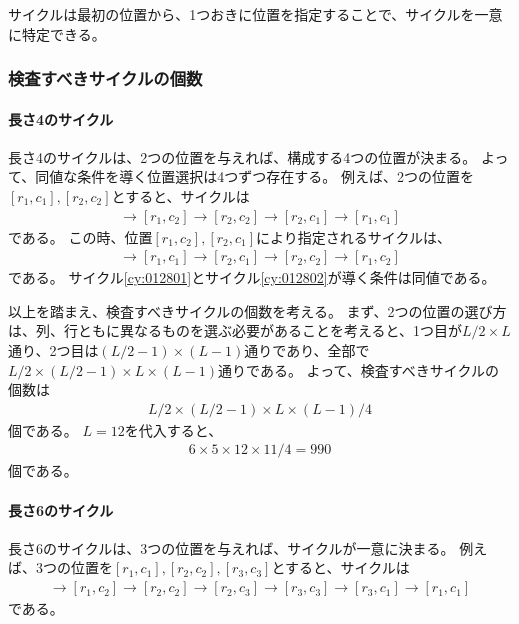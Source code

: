 \documentclass[a4paper,11pt,dvipdfmx]{jsarticle}
\theoremstyle{definition}
\begin{document}
サイクルは最初の位置から、1つおきに位置を指定することで、サイクルを一意に特定できる。

\subsubsection{検査すべきサイクルの個数}
\paragraph{長さ4のサイクル}
長さ4のサイクルは、2つの位置を与えれば、構成する4つの位置が決まる。
よって、同値な条件を導く位置選択は4つずつ存在する。
例えば、2つの位置を$[r_1, c_1],[r_2, c_2]$とすると、サイクルは
\begin{align}
  [r_1, c_1]\rightarrow[r_1,c_2]\rightarrow[r_2,c_2]\rightarrow[r_2,c_1]\rightarrow[r_1,c_1]\label{cy:012801}
\end{align}
である。
この時、位置$[r_1, c_2],[r_2, c_1]$により指定されるサイクルは、
\begin{align}
  [r_1,c_2]\rightarrow[r_1,c_1]\rightarrow[r_2,c_1]\rightarrow[r_2,c_2]\rightarrow[r_1,c_2]\label{cy:012802}
\end{align}
である。
サイクル\ref{cy:012801}とサイクル\ref{cy:012802}が導く条件は同値である。

以上を踏まえ、検査すべきサイクルの個数を考える。
まず、2つの位置の選び方は、列、行ともに異なるものを選ぶ必要があることを考えると、1つ目が$L/2\times L$通り、2つ目は$(L/2-1)\times (L-1)$通りであり、全部で$L/2\times (L/2-1)\times L\times (L-1)$通りである。
よって、検査すべきサイクルの個数は
\begin{align}
  L/2\times (L/2-1)\times L\times (L-1)/4\label{eq:012803}
\end{align}
個である。
$L=12$を代入すると、
\begin{align}
  6\times 5\times 12\times 11 /4 = 990
\end{align}
個である。

\paragraph{長さ6のサイクル}
長さ6のサイクルは、3つの位置を与えれば、サイクルが一意に決まる。
例えば、3つの位置を$[r_1, c_1],[r_2, c_2], [r_3, c_3]$とすると、サイクルは
\begin{align}
  [r_1, c_1]\rightarrow[r_1,c_2]\rightarrow[r_2,c_2]\rightarrow[r_2,c_3]\rightarrow[r_3,c_3]\rightarrow[r_3,c_1]\rightarrow[r_1,c_1]\label{cy:012804}
\end{align}
である。
\end{document}

